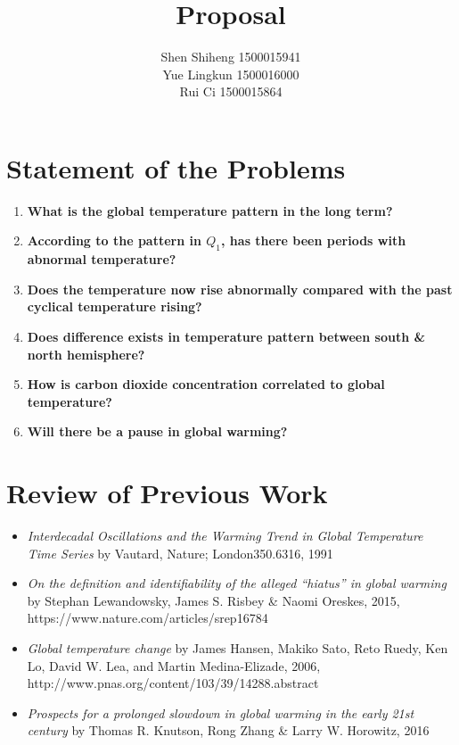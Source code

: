 \documentclass[10pt,a4paper]{article}
\author{Shen Shiheng 1500015941 \\ Yue Lingkun 1500016000\\ Rui Ci 1500015864}
\title{\textbf{Proposal}}
\begin{document}
\maketitle

\section{Statement of the Problems}
\begin{enumerate}
	\item \textbf{What is the global temperature pattern in the long term?}
	\item \textbf{According to the pattern in $Q_1$, has there been periods with abnormal temperature?}
	\item \textbf{Does the temperature now rise abnormally compared with the past cyclical temperature rising?}  
	\item \textbf{Does difference exists in temperature pattern between south \& north hemisphere?}
	\item \textbf{How is carbon dioxide concentration correlated to global temperature?} 
	\item \textbf{Will there be a pause in global warming?} 
\end{enumerate}

\section{Review of Previous Work}
\begin{itemize}
	\item \textit{Interdecadal Oscillations and the Warming Trend in Global Temperature Time Series} by Vautard, Nature; London350.6316, 1991 
	\item \textit{On the definition and identifiability of the alleged “hiatus” in global warming} by Stephan Lewandowsky, James S. Risbey \& Naomi Oreskes, 2015, https://www.nature.com/articles/srep16784 
	\item \textit{Global temperature change} by James Hansen, Makiko Sato, Reto Ruedy, Ken Lo, David W. Lea, and Martin Medina-Elizade, 2006, http://www.pnas.org/content/103/39/14288.abstract 
	\item \textit{Prospects for a prolonged slowdown in global warming in the early 21st century} by Thomas R. Knutson, Rong Zhang \& Larry W. Horowitz, 2016
\end{itemize}
\end{document}
